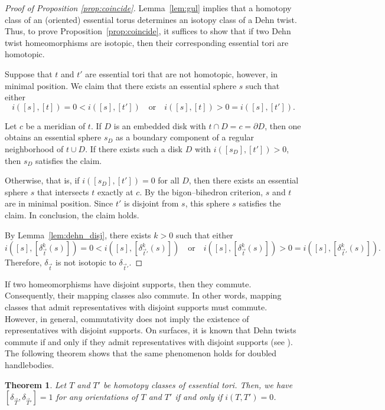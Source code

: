 \documentclass[12pt,a4paper]{amsart}
\numberwithin{equation}{section}
\theoremstyle{plain}
\newtheorem{theorem}{Theorem}[section]
\theoremstyle{definition}
\theoremstyle{remark}
\begin{document}
\begin{proof}[Proof of Proposition \ref{prop:coincide}]
    Lemma~\ref{lem:gul} implies that a homotopy class of an (oriented) essential torus determines an isotopy class of a Dehn twist.
    Thus, to prove Proposition~\ref{prop:coincide}, it suffices to show that if two Dehn twist homeomorphisms are isotopic, then their corresponding essential tori are homotopic.
    
    Suppose that $t$ and $t'$ are essential tori that are not homotopic, however, in minimal position.
    We claim that there exists an essential sphere $s$ such that either
    \[
        i([s],[t])=0<i([s],[t']) \quad \text{or} \quad i([s],[t])>0=i([s],[t']).
    \]
    
    Let $c$ be a meridian of $t$.
    If $D$ is an embedded disk with $t\cap D=c=\partial D$, then one obtains an essential sphere $s_D$ as a boundary component of a regular neighborhood of $t\cup D$.
    If there exists such a disk $D$ with $i([s_D],[t'])>0$, then $s_D$ satisfies the claim.
    
    Otherwise, that is, if $i([s_D],[t']) = 0$ for all $D$, then there exists an essential sphere $s$ that intersects $t$ exactly at $c$.
    By the bigon--bihedron criterion, $s$ and $t$ are in minimal position.
    Since $t'$ is disjoint from $s$, this sphere $s$ satisfies the claim.
    In conclusion, the claim holds.
    
    By Lemma~\ref{lem:dehn_disj}, there exists $k>0$ such that either
    \[
        i([s],[\delta_{\vec t}^k(s)])=0<i([s],[\delta_{\vec t'}^k(s)]) \quad \text{or} \quad i([s],[\delta_{\vec t}^k(s)])>0=i([s],[\delta_{\vec t'}^k(s)]).
    \]
    Therefore, $\delta_{\vec t}$ is not isotopic to $\delta_{\vec t'}$.
\end{proof}

If two homeomorphisms have disjoint supports, then they commute.
Consequently, their mapping classes also commute.
In other words, mapping classes that admit representatives with disjoint supports must commute.
However, in general, commutativity does not imply the existence of representatives with disjoint supports.
On surfaces, it is known that Dehn twists commute if and only if they admit representatives with disjoint supports (see \cite[Fact~3.6]{MR2850125}).
The following theorem shows that the same phenomenon holds for doubled handlebodies.

\begin{theorem} \label{thm:commuting}
    Let $T$ and $T'$ be homotopy classes of essential tori.
    Then, we have $[\delta_{\vec{T}}, \delta_{\vec{T}'}] = 1$ for any orientations of $T$ and $T'$ if and only if $i(T, T') = 0$.
\end{theorem}
\end{document}
